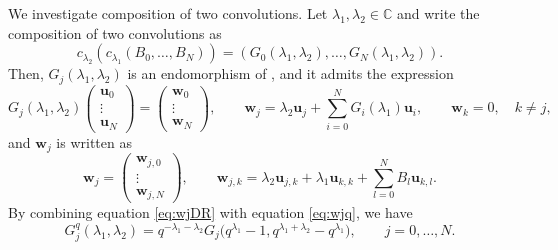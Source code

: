 \documentclass[pdftex]{sigma}
\numberwithin{equation}{section}
\theoremstyle{definition}
\begin{document}
We investigate composition of two convolutions.
Let $\lambda _1 , \lambda _2 \in \mathbb{C} $ and write the composition of two convolutions as
\[
c _{\lambda _2} (c _{\lambda _1} (B_0, \dots ,B_N)) = ( G_0 (\lambda _1, \lambda _2 ) , \dots , G_N (\lambda _1, \lambda _2 ) ).
\]
Then, $G_j (\lambda _1, \lambda _2 )$ is an endomorphism of , and it admits the expression
\begin{equation*}
G_j (\lambda _1, \lambda _2 ) \begin{pmatrix} \mathbf{u}_{0} \\ \vdots \\ \mathbf{u}_{N} \end{pmatrix} =\begin{pmatrix} \mathbf{w}_{0} \\ \vdots \\ \mathbf{w}_{N} \end{pmatrix}, \qquad \mathbf{w}_j = \lambda _2 \mathbf{u}_j + \sum _{i=0}^{N} G_i (\lambda _1) \mathbf{u}_i ,\qquad \mathbf{w}_k =0, \quad k\neq j,
\end{equation*}
and $\mathbf{w}_j $ is written as
\begin{equation}
\mathbf{w}_{j} = \begin{pmatrix} \mathbf{w}_{j,0} \\ \vdots \\ \mathbf{w}_{j,N} \end{pmatrix} ,\qquad \mathbf{w}_{j,k} = \lambda _2 \mathbf{u}_{j,k} + \lambda _1 \mathbf{u}_{k,k} + \sum _{l=0}^{N} B_{l} \mathbf{u}_{k,l}. \label{eq:wjDR}
\end{equation}
By combining equation \eqref{eq:wjDR} with equation \eqref{eq:wjq}, we have
\begin{equation}
G_j^{q} (\lambda _1, \lambda _2 ) = q^{-\lambda _1 -\lambda _2} G_j \bigl(q^{\lambda _1} -1 , q^{\lambda _1 + \lambda _2} - q^{\lambda _1 } \bigr) ,\qquad j=0,\dots ,N.
\label{eq:Gjql1l2GDR}
\end{equation}
\end{document}
